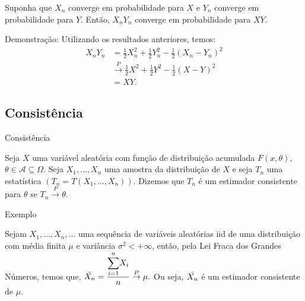 \documentclass[12pt]{beamer}
\begin{document}
\begin{frame}{}
\begin{Teorema}
\justifying
Suponha que $X_{n}$ converge em probabilidade para $X$ e $Y_{n}$ converge em probabilidade para $Y$. Então, $X_{n}Y_{n}$ converge em probabilidade para $XY$.
\end{Teorema}
\begin{block}{Demonstração:}
\justifying
Utilizando os resultados anteriores, temos:
\begin{align*}
    X_{n}Y_{n} &= \frac{1}{2}X^{2}_{n} + \frac{1}{2}Y^{2}_{n} - \frac{1}{2}(X_{n} - Y_{n})^{2}\\  
    &\xrightarrow{P} \frac{1}{2}X^2 + \frac{1}{2}Y^2 - \frac{1}{2}(X - Y)^{2}\\ 
    &= XY.
\end{align*}
\end{block}
\end{frame}

\subsection{Consistência}
\begin{frame}{Consistência}
\begin{definicao}
\justifying
 Seja $X$ uma variável aleatória com função de distribuição acumulada $F(x, \theta)$, $\theta \in \mathcal{A}\subseteq \Omega$. Seja $X_1, \ldots, X_{n}$ uma amostra da distribuição de $X$ e seja $T_{n}$ uma estatística $(T_{n}=T(X_1, \ldots, X_{n}))$. Dizemos que $T_{n}$ é um estimador consistente para $\theta$ se $T_{n} \xrightarrow{P} \theta$.
\end{definicao}    
\end{frame}

\begin{frame}{Exemplo}
\begin{block}{}
\justifying
Sejam $X_{1}, \ldots, X_{n},\ldots$ uma sequência de variáveis aleatórias iid de uma distribuição com média finita $\mu$ e variância $\sigma^{2}<+\infty$, então, pela Lei Fraca dos Grandes Números, temos que, $\Bar{X_{n}}=\dfrac{{\displaystyle \sum_{i=1}^{n}} X_{i}}{n}\overset{P}{\rightarrow} \mu.$ Ou seja, $\Bar{X_{n}}$ é um estimador consistente de $\mu$.
\end{block}
\end{frame}
\end{document}
